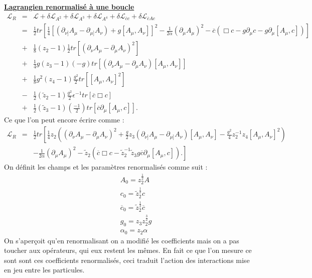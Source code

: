 \documentclass[a4paper,11pt]{article} %
\theoremstyle{plain}
\theoremstyle{definition}
\theoremstyle{remark}
\numberwithin{equation}{section}
\numberwithin{equation}{subsection}
\numberwithin{figure}{section}
\begin{document}
\vspace{2cm}
\noindent
\underline{\textbf{Lagrangien renormalisé à une boucle}}\\
\begin{eqnarray*}
\mathcal{L}_{R} &=& \mathcal{L} + \delta \mathcal{L}_{A^2} +  \delta \mathcal{L}_{A^3} +  \delta \mathcal{L}_{A^4}  
+  \delta \mathcal{L}_{\overline{c}c}  + \delta \mathcal{L}_{\overline{c}Ac}  \\
                              &=&  \frac{1}{2} tr[ \frac{1}{4} [ ( \partial_{\nu]}A_{\mu}- \partial_{\mu]}A_{\nu} ) 
+ g [A_{\mu},A_{\nu}] ]^2 
- \frac{1}{2 \alpha} (\partial_{\mu} A_{\mu} )^2 - \overline{c} ( \Box c - g \partial_{\mu}c - g\partial_{\mu} [A_{\mu},c]) ]  \nonumber  \\
                              &+& \frac{1}{8} (z_{2} - 1) \frac{1}{2} tr [ ( \partial_{\nu} A_{\mu} - \partial_{\mu} A_{\nu} )^2 ] \nonumber \\
                              &+& \frac{1}{4} g  (z_{3} - 1) (-g) 
tr [ ( \partial_{\nu} A_{\mu} - \partial_{\mu} A_{\nu} ) [A_{\mu},A_{\nu}] ] \nonumber \\
                              &+& \frac{1}{8} g^2 (z_{4} - 1) \frac{g^2}{2} tr [ [A_{\mu},A_{\nu}]^2  ] \nonumber \\
                              &-& \frac{1}{2} (\tilde{z}_{2} - 1) \frac{g^{2}}{2}  \epsilon^{-1} tr [ \overline{c} \Box c ] \nonumber \\
                              &+& \frac{1}{2}  (\tilde{z}_{3} - 1) ( \frac{-1}{2} ) tr [ \overline{c} \partial_{\mu} [A_{\mu}, c] ].
\end{eqnarray*}
Ce que l'on peut encore écrire comme :
\begin{eqnarray*}
\mathcal{L}_{R} &=& \frac{1}{2} tr\left[ \frac{1}{4} z_{2} \left( ( \partial_{\nu}A_{\mu}- \partial_{\mu}A_{\nu} )^2 
+ \frac{g}{2} z_{3} 
( \partial_{\nu]}A_{\mu}- \partial_{\mu]}A_{\nu} ) [A_{\mu},A_{\nu}]  - \frac{g^2}{4} z_{2}^{-1}  z_{4}[A_{\mu},A_{\nu}] ^2 \right) \right. \nonumber \\
  &&\left.  - \frac{1}{2 \alpha} 
(\partial_{\mu} A_{\mu} )^2 - \tilde{z}_{2} \left(\overline{c} \Box c - \tilde{z}_{2}^{-1} \tilde{z}_{3} g \overline{c} \partial_{\mu} [A_{\mu},c] \right). \right]
\end{eqnarray*}
On définit les champs et les paramètres renormalisés comme suit :
\begin{eqnarray*}
 && A_{0} = z_{2}^{\frac{1}{2}} A  \\
 && c_{0} = \tilde{z}_{2}^{\frac{1}{2}} c  \\
 && \overline{c}_{0} = \tilde{z}_{2}^{\frac{1}{2}} \overline{c} \\
 && g_{0} = z_{3}z_{2}^{\frac{3}{2}} g \\
 && \alpha_{0} = z_{2} \alpha
\end{eqnarray*}
On s'aperçoit qu'en renormalisant on a modifié les coefficients mais on a pas toucher aux opérateurs, qui eux restent les mêmes. 
En fait ce que l'on mesure ce sont sont ces coefficients renormalisés, ceci traduit l'action des interactions mise en jeu entre 
les particules. 
\end{document}
